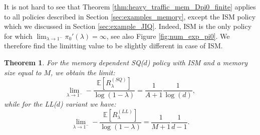 \documentclass[12pt]{report}
\newcommand{\E}{\mathbb{E}}
\newtheorem{theorem}{Theorem}
\begin{document}
It is not hard to see that Theorem \ref{thm:heavy_traffic_mem_Dpi0_finite} applies to all policies described in Section \ref{sec:examples_memory}, except the ISM policy which we discussed in Section \ref{sec:example_JIQ}. Indeed, ISM is the only policy for which $\lim_{\lambda \rightarrow 1^-} \pi_0'(\lambda) = \infty$, see also Figure \ref{fig:num_exp_pi0}. We therefore find the limitting value to be slightly different in case of ISM.
\begin{theorem}
For the memory dependent SQ($d$) policy with ISM and a memory size equal to $M$, we obtain the limit:
\begin{equation}\label{eq:heavy_traffic_mem_SQd}
\lim_{\lambda \rightarrow 1^-} -\frac{\E[R_\lambda^{(SQ)}]}{\log(1-\lambda)}=\frac{1}{A+1}\frac{1}{\log(d)},
\end{equation}
while for the LL($d$) variant we have:
\begin{equation}\label{eq:heavy_traffic_mem_SQd}
\lim_{\lambda \rightarrow 1^-} -\frac{\E[R_\lambda^{(LL)}]}{\log(1-\lambda)}=\frac{1}{M+1}\frac{1}{d-1}.
\end{equation}
\end{theorem}
\end{document}
